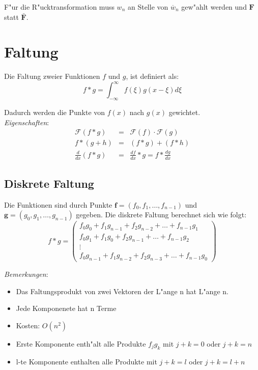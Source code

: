 \documentclass[german, 10pt, a4paper, twocolumn]{scrartcl}
\begin{document}
F"ur die R"ucktransformation muss $w_n$ an Stelle von $\overline{w}_n$ gew"ahlt werden und $\mathbf{F}$ statt $\mathbf{\bar{F}}$.

\section{Faltung}

Die Faltung zweier Funktionen $f$ und $g$, ist definiert als:
\begin{displaymath}
	f \ast g = \int_{-\infty}^{\infty} f(\xi)g(x-\xi)d\xi
\end{displaymath}

Dadurch werden die Punkte von $f(x)$ nach $g(x)$ gewichtet.\\

\textit{Eigenschaften}:
\begin{eqnarray}
	\mathcal{F}(f\ast g) &		= &		\mathcal{F}(f) \cdotp \mathcal{F}(g) \nonumber \\
	f\ast (g+ h) &			= &		(f\ast g)+ (f\ast h) \nonumber \\
	\frac{d}{dx}(f\ast g) &		= &		\frac{df}{dx}\ast g = f\ast \frac{dg}{dx} \nonumber 
\end{eqnarray}

\subsection{Diskrete Faltung}

Die Funktionen sind durch Punkte $\mathbf{f}=(f_0,f_1,\ldots,f_{n-1})$ und $\mathbf{g}=(g_0,g_1,\ldots,g_{n-1})$ gegeben. Die diskrete Faltung berechnet sich wie folgt:
\begin{displaymath}
	f\ast g = \left (
			\begin{array}{c}
				f_0 g_0 + f_1 g_{n-1} + f_2 g_{n-2} + \ldots + f_{n-1} g_1 \\
				f_0 g_1 + f_1 g_{0} +f_2 g_{n-1} + \ldots +f_{n-1} g_2 \\
				\vdots\\
				f_0 g_{n-1} + f_1 g_{n-2} + f_2 g_{n-3} + \ldots + f_{n-1} g_0
			\end{array}
		\right )
\end{displaymath}

\textit{Bemerkungen}:
\begin{itemize}
	\item Das Faltungsprodukt von zwei Vektoren der L"ange n hat L"ange n.
	\item Jede Komponenete hat n Terme
	\item Kosten: $O(n^2)$
	\item Erste Komponente enth"alt alle Produkte $f_j g_k$ mit $j+k=0$ oder $j+k=n$
	\item l-te Komponente enthalten alle Produkte mit $j+k=l$ oder $j+k=l+n$
\end{itemize}
\end{document}
